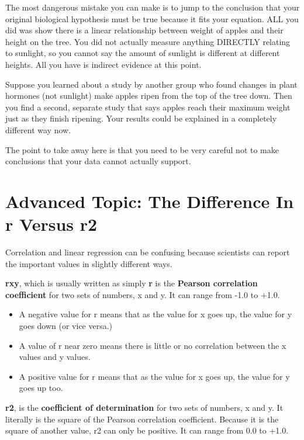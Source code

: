 \documentclass[
]{book}
\providecommand{\tightlist}{%
  \setlength{\itemsep}{0pt}\setlength{\parskip}{0pt}}
\begin{document}
The most dangerous mistake you can make is to jump to the conclusion that your original biological hypothesis must be true because it fits your equation. ALL you did was show there is a linear relationship between weight of apples and their height on the tree. You did not actually measure anything DIRECTLY relating to sunlight, so you cannot say the amount of sunlight is different at different heights. All you have is indirect evidence at this point.

Suppose you learned about a study by another group who found changes in plant hormones (not sunlight) make apples ripen from the top of the tree down. Then you find a second, separate study that says apples reach their maximum weight just as they finish ripening. Your results could be explained in a completely different way now.

The point to take away here is that you need to be very careful not to make conclusions that your data cannot actually support.

\hypertarget{advanced-topic-the-difference-in-r-versus-r2}{%
\section{Advanced Topic: The Difference In r Versus r2}\label{advanced-topic-the-difference-in-r-versus-r2}}

Correlation and linear regression can be confusing because scientists can report the important values in slightly different ways.

\textbf{rxy}, which is usually written as simply \textbf{r} is the \textbf{Pearson correlation coefficient} for two sets of numbers, x and y. It can range from -1.0 to +1.0.

\begin{itemize}
\tightlist
\item
  A negative value for r means that as the value for x goes up, the value for y goes down (or vice versa.)
\item
  A value of r near zero means there is little or no correlation between the x values and y values.
\item
  A positive value for r means that as the value for x goes up, the value for y goes up too.
\end{itemize}

\textbf{r2}, is the \textbf{coefficient of determination} for two sets of numbers, x and y. It literally is the square of the Pearson correlation coefficient. Because it is the square of another value, r2 can only be positive. It can range from 0.0 to +1.0.
\end{document}
